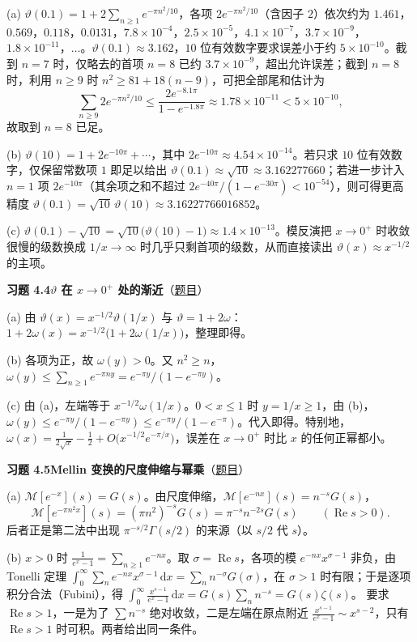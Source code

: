 \documentclass[11pt,a4paper]{article}
\newcommand{\dd}{\,\mathrm{d}}
\renewcommand{\Re}{\operatorname{Re}}
\newcommand{\Sol}[2]{%
  \par\addvspace{1.2em}\noindent
  \hypertarget{s:#1}{}\textbf{习题 #1\quad #2}\hfill{\small（\hyperlink{q:#1}{题目}）}\par
  \nopagebreak\smallskip}
\begin{document}
(a) $\vartheta(0.1)=1+2\sum_{n\ge1}e^{-\pi n^2/10}$，各项 $2e^{-\pi n^2/10}$（含因子 $2$）依次约为 $1.461$，$0.569$，$0.118$，$0.0131$，$7.8\times10^{-4}$，$2.5\times10^{-5}$，$4.1\times10^{-7}$，$3.7\times10^{-9}$，$1.8\times10^{-11}$，$\dots$。$\vartheta(0.1)\approx3.162$，$10$ 位有效数字要求误差小于约 $5\times10^{-10}$。截到 $n=7$ 时，仅略去的首项 $n=8$ 已约 $3.7\times10^{-9}$，超出允许误差；截到 $n=8$ 时，利用 $n\ge9$ 时 $n^2\ge81+18(n-9)$，可把全部尾和估计为
\[
  \sum_{n\ge9}2e^{-\pi n^2/10}\le\frac{2e^{-8.1\pi}}{1-e^{-1.8\pi}}\approx1.78\times10^{-11}<5\times10^{-10},
\]
故取到 $n=8$ 已足。

(b) $\vartheta(10)=1+2e^{-10\pi}+\cdots$，其中 $2e^{-10\pi}\approx4.54\times10^{-14}$。若只求 $10$ 位有效数字，仅保留常数项 $1$ 即足以给出 $\vartheta(0.1)\approx\sqrt{10}\approx3.162277660$；若进一步计入 $n=1$ 项 $2e^{-10\pi}$（其余项之和不超过 $2e^{-40\pi}/(1-e^{-30\pi})<10^{-54}$），则可得更高精度 $\vartheta(0.1)=\sqrt{10}\,\vartheta(10)\approx3.16227766016852$。

(c) $\vartheta(0.1)-\sqrt{10}=\sqrt{10}\bigl(\vartheta(10)-1\bigr)\approx1.4\times10^{-13}$。模反演把 $x\to0^+$ 时收敛很慢的级数换成 $1/x\to\infty$ 时几乎只剩首项的级数，从而直接读出 $\vartheta(x)\approx x^{-1/2}$ 的主项。

\Sol{4.4}{$\vartheta$ 在 $x\to0^+$ 处的渐近}
(a) 由 $\vartheta(x)=x^{-1/2}\vartheta(1/x)$ 与 $\vartheta=1+2\omega$：$1+2\omega(x)=x^{-1/2}\bigl(1+2\omega(1/x)\bigr)$，整理即得。

(b) 各项为正，故 $\omega(y)>0$。又 $n^2\ge n$，$\omega(y)\le\sum_{n\ge1}e^{-\pi ny}=e^{-\pi y}/(1-e^{-\pi y})$。

(c) 由 (a)，左端等于 $x^{-1/2}\omega(1/x)$。$0<x\le1$ 时 $y=1/x\ge1$，由 (b)，$\omega(y)\le e^{-\pi y}/(1-e^{-\pi y})\le e^{-\pi y}/(1-e^{-\pi})$。代入即得。特别地，$\omega(x)=\tfrac1{2\sqrt x}-\tfrac12+O\bigl(x^{-1/2}e^{-\pi/x}\bigr)$，误差在 $x\to0^+$ 时比 $x$ 的任何正幂都小。

\Sol{4.5}{Mellin 变换的尺度伸缩与幂乘}
(a) $\mathcal M[e^{-x}](s)=G(s)$。由尺度伸缩，$\mathcal M[e^{-nx}](s)=n^{-s}G(s)$，
\[
  \mathcal M[e^{-\pi n^2x}](s)=(\pi n^2)^{-s}G(s)=\pi^{-s}n^{-2s}G(s)\qquad(\Re s>0).
\]
后者正是第二法中出现 $\pi^{-s/2}\Gamma(s/2)$ 的来源（以 $s/2$ 代 $s$）。

(b) $x>0$ 时 $\frac1{e^x-1}=\sum_{n\ge1}e^{-nx}$。取 $\sigma=\Re s$，各项的模 $e^{-nx}x^{\sigma-1}$ 非负，由 Tonelli 定理
$\int_0^\infty\sum_ne^{-nx}x^{\sigma-1}\dd x=\sum_nn^{-\sigma}G(\sigma)$，在 $\sigma>1$ 时有限；于是逐项积分合法（Fubini），得 $\int_0^\infty\frac{x^{s-1}}{e^x-1}\dd x=G(s)\sum_nn^{-s}=G(s)\zeta(s)$。
要求 $\Re s>1$，一是为了 $\sum n^{-s}$ 绝对收敛，二是左端在原点附近 $\frac{x^{s-1}}{e^x-1}\sim x^{s-2}$，只有 $\Re s>1$ 时可积。两者给出同一条件。
\end{document}
